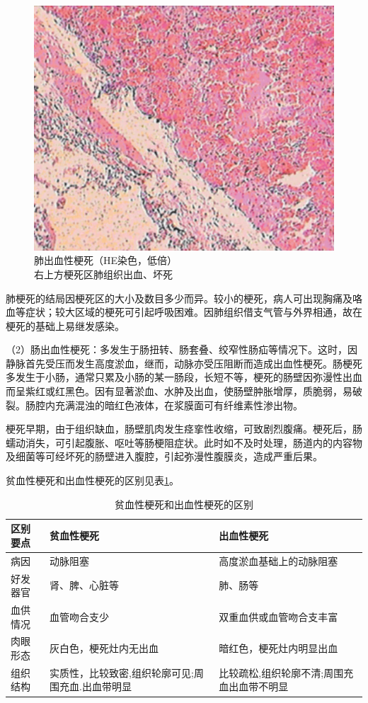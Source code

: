 \begin{figure}[!htbp]
\centering
\includegraphics{./images/Image00048.jpg}
\caption{肺出血性梗死（HE染色，低倍） \\ {\small 右上方梗死区肺组织出血、坏死}}
\label{fig3-14} 
\end{figure}


肺梗死的结局因梗死区的大小及数目多少而异。较小的梗死，病人可出现胸痛及咯血等症状；较大区域的梗死可引起呼吸困难。因肺组织借支气管与外界相通，故在梗死的基础上易继发感染。

（2）肠出血性梗死：多发生于肠扭转、肠套叠、绞窄性肠疝等情况下。这时，因静脉首先受压而发生高度淤血，继而，动脉亦受压阻断而造成出血性梗死。肠梗死多发生于小肠，通常只累及小肠的某一肠段，长短不等，梗死的肠壁因弥漫性出血而呈紫红或红黑色。因有显著淤血、水肿及出血，使肠壁肿胀增厚，质脆弱，易破裂。肠腔内充满混浊的暗红色液体，在浆膜面可有纤维素性渗出物。

梗死早期，由于组织缺血，肠壁肌肉发生痉挛性收缩，可致剧烈腹痛。梗死后，肠蠕动消失，可引起腹胀、呕吐等肠梗阻症状。此时如不及时处理，肠道内的内容物及细菌等可经坏死的肠壁进入腹腔，引起弥漫性腹膜炎，造成严重后果。

贫血性梗死和出血性梗死的区别见表\ref{tab3-2}。
\begin{table}[ht]
	\caption{贫血性梗死和出血性梗死的区别}
	\label{tab3-2}
	\centering
	\begin{tabular}{lp{5cm}p{5cm}}
	\toprule
	区别要点 & 贫血性梗死
    & 出血性梗死 \\
	\midrule
	病因 & 动脉阻塞 &
    高度淤血基础上的动脉阻塞\\
	好发器官 & 肾、脾、心脏等 
	& 肺、肠等\\
	血供情况 & 血管吻合支少 & 双重血供或血管吻合支丰富\\
	肉眼形态 & 灰白色，梗死灶内无出血 & 暗红色，梗死灶内明显出血\\
	组织结构 &  实质性，比较致密,组织轮廓可见;周围充血.出血带明显 & 比较疏松,组织轮廓不清;周围充血出血带不明显\\
	\bottomrule
	\end{tabular}
\end{table}

